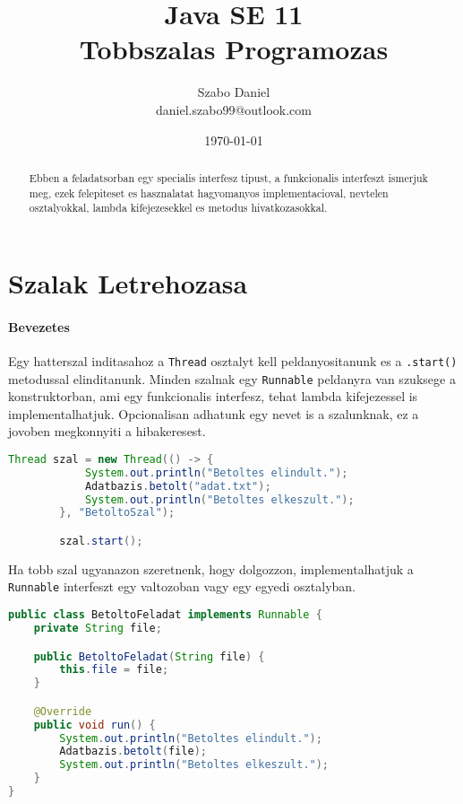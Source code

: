 \documentclass{article}
\title{%
    Java SE 11 \\
    \large Tobbszalas Programozas}
\author{Szabo Daniel\\daniel.szabo99@outlook.com}
\date{\today}
\let\l\lstinline
\begin{document}
    \maketitle
    \begin{abstract}
        Ebben a feladatsorban egy specialis interfesz tipust, a funkcionalis interfeszt ismerjuk meg, ezek felepiteset es hasznalatat hagyomanyos implementacioval, nevtelen osztalyokkal, lambda kifejezesekkel es metodus hivatkozasokkal.
    \end{abstract}

    \newpage

    \tableofcontents{}

    \newpage


    \section{Szalak Letrehozasa}

    \paragraph{Bevezetes}


		Egy hatterszal inditasahoz a \l{Thread} osztalyt kell peldanyositanunk es a \l{.start()} metodussal elinditanunk. Minden szalnak egy \l{Runnable} peldanyra van szuksege a konstruktorban, ami egy funkcionalis interfesz, tehat lambda kifejezessel is implementalhatjuk. Opcionalisan adhatunk egy nevet is a szalunknak, ez a jovoben megkonnyiti a hibakeresest.


    \begin{lstlisting}[language=Java, caption=Uj szal inditasa]
		Thread szal = new Thread(() -> {
			System.out.println("Betoltes elindult.");
			Adatbazis.betolt("adat.txt");
			System.out.println("Betoltes elkeszult.");
		}, "BetoltoSzal");

		szal.start();
    \end{lstlisting}

    Ha tobb szal ugyanazon szeretnenk, hogy dolgozzon, implementalhatjuk a \l{Runnable} interfeszt egy valtozoban vagy egy egyedi osztalyban.

    \begin{lstlisting}[language=Java, caption=Uj szal inditasa]
public class BetoltoFeladat implements Runnable {
	private String file;

	public BetoltoFeladat(String file) {
		this.file = file;
	}

	@Override
	public void run() {
		System.out.println("Betoltes elindult.");
		Adatbazis.betolt(file);
		System.out.println("Betoltes elkeszult.");
	}
}
    \end{lstlisting}
\end{document}
